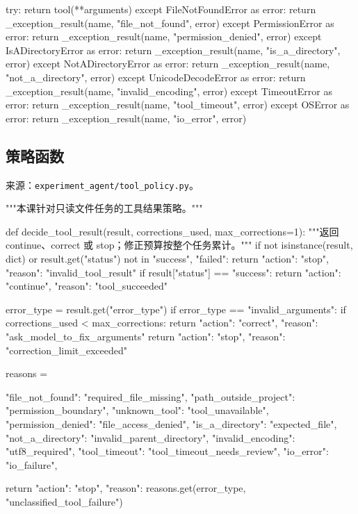 \begin{Code}
    try:
        return tool(**arguments)
    except FileNotFoundError as error:
        return _exception_result(name, "file_not_found", error)
    except PermissionError as error:
        return _exception_result(name, "permission_denied", error)
    except IsADirectoryError as error:
        return _exception_result(name, "is_a_directory", error)
    except NotADirectoryError as error:
        return _exception_result(name, "not_a_directory", error)
    except UnicodeDecodeError as error:
        return _exception_result(name, "invalid_encoding", error)
    except TimeoutError as error:
        return _exception_result(name, "tool_timeout", error)
    except OSError as error:
        return _exception_result(name, "io_error", error)
\end{Code}

\subsection{策略函数}

来源：\nolinkurl{experiment_agent/tool_policy.py}。

\begin{Code}
"""本课针对只读文件任务的工具结果策略。"""


def decide_tool_result(result, corrections_used, max_corrections=1):
    """返回 continue、correct 或 stop；修正预算按整个任务累计。"""
    if not isinstance(result, dict) or result.get("status") not in {"success", "failed"}:
        return {"action": "stop", "reason": "invalid_tool_result"}
    if result["status"] == "success":
        return {"action": "continue", "reason": "tool_succeeded"}

    error_type = result.get("error_type")
    if error_type == "invalid_arguments":
        if corrections_used < max_corrections:
            return {"action": "correct", "reason": "ask_model_to_fix_arguments"}
        return {"action": "stop", "reason": "correction_limit_exceeded"}

    reasons = {
        "file_not_found": "required_file_missing",
        "path_outside_project": "permission_boundary",
        "unknown_tool": "tool_unavailable",
        "permission_denied": "file_access_denied",
        "is_a_directory": "expected_file",
        "not_a_directory": "invalid_parent_directory",
        "invalid_encoding": "utf8_required",
        "tool_timeout": "tool_timeout_needs_review",
        "io_error": "io_failure",
        
    }
    return {"action": "stop", "reason": reasons.get(error_type, "unclassified_tool_failure")}
\end{Code}


